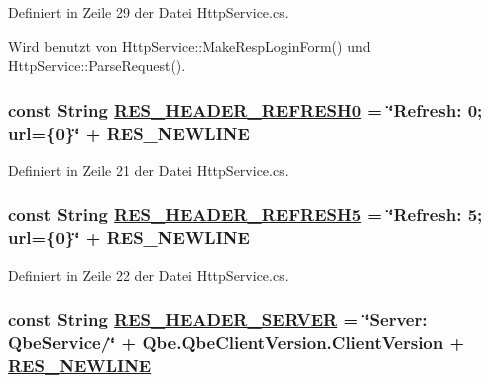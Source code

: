 Definiert in Zeile 29 der Datei Http\-Service.cs.

Wird benutzt von Http\-Service::Make\-Resp\-Login\-Form() und Http\-Service::Parse\-Request().\hypertarget{classQbeSAS_1_1HttpService_QbeSAS_1_1HttpServicer3}{
\subsubsection[RES\_\-HEADER\_\-REFRESH0]{\setlength{\rightskip}{0pt plus 5cm}const String \hyperlink{classQbeSAS_1_1HttpService_QbeSAS_1_1HttpServicer3}{RES\_\-HEADER\_\-REFRESH0} = \char`\"{}Refresh: 0; url=\{0\}\char`\"{} + RES\_\-NEWLINE}}
\label{classQbeSAS_1_1HttpService_QbeSAS_1_1HttpServicer3}




Definiert in Zeile 21 der Datei Http\-Service.cs.\hypertarget{classQbeSAS_1_1HttpService_QbeSAS_1_1HttpServicer4}{
\subsubsection[RES\_\-HEADER\_\-REFRESH5]{\setlength{\rightskip}{0pt plus 5cm}const String \hyperlink{classQbeSAS_1_1HttpService_QbeSAS_1_1HttpServicer4}{RES\_\-HEADER\_\-REFRESH5} = \char`\"{}Refresh: 5; url=\{0\}\char`\"{} + RES\_\-NEWLINE}}
\label{classQbeSAS_1_1HttpService_QbeSAS_1_1HttpServicer4}




Definiert in Zeile 22 der Datei Http\-Service.cs.\hypertarget{classQbeSAS_1_1HttpService_QbeSAS_1_1HttpServicer1}{
\subsubsection[RES\_\-HEADER\_\-SERVER]{\setlength{\rightskip}{0pt plus 5cm}const String \hyperlink{classQbeSAS_1_1HttpService_QbeSAS_1_1HttpServicer1}{RES\_\-HEADER\_\-SERVER} = \char`\"{}Server: Qbe\-Service/\char`\"{} + Qbe.Qbe\-Client\-Version.Client\-Version + \hyperlink{classQbeSAS_1_1HttpService_QbeSAS_1_1HttpServicer0}{RES\_\-NEWLINE}}}
\label{classQbeSAS_1_1HttpService_QbeSAS_1_1HttpServicer1}




